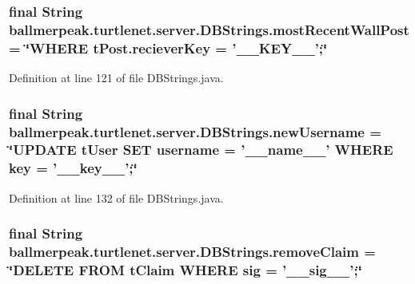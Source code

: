 \hypertarget{classballmerpeak_1_1turtlenet_1_1server_1_1DBStrings_ad9c0536856622b589ca1c0877681c86c}{
\subsubsection[{most\-Recent\-Wall\-Post}]{\setlength{\rightskip}{0pt plus 5cm}final String ballmerpeak.\-turtlenet.\-server.\-D\-B\-Strings.\-most\-Recent\-Wall\-Post = \char`\"{}W\-H\-E\-R\-E t\-Post.\-reciever\-Key = '\-\_\-\-\_\-\-K\-E\-Y\-\_\-\-\_\-';\char`\"{}\hspace{0.3cm}{\ttfamily [static]}}}\label{classballmerpeak_1_1turtlenet_1_1server_1_1DBStrings_ad9c0536856622b589ca1c0877681c86c}


Definition at line 121 of file D\-B\-Strings.\-java.

\hypertarget{classballmerpeak_1_1turtlenet_1_1server_1_1DBStrings_a9561d2bc731daafe8e20cb46dc51cfb6}{
\subsubsection[{new\-Username}]{\setlength{\rightskip}{0pt plus 5cm}final String ballmerpeak.\-turtlenet.\-server.\-D\-B\-Strings.\-new\-Username = \char`\"{}U\-P\-D\-A\-T\-E t\-User S\-E\-T username = '\-\_\-\-\_\-name\-\_\-\-\_\-' W\-H\-E\-R\-E key = '\-\_\-\-\_\-key\-\_\-\-\_\-';\char`\"{}\hspace{0.3cm}{\ttfamily [static]}}}\label{classballmerpeak_1_1turtlenet_1_1server_1_1DBStrings_a9561d2bc731daafe8e20cb46dc51cfb6}


Definition at line 132 of file D\-B\-Strings.\-java.

\hypertarget{classballmerpeak_1_1turtlenet_1_1server_1_1DBStrings_a01691bb9e0418b279a1eb0bcddb94b14}{
\subsubsection[{remove\-Claim}]{\setlength{\rightskip}{0pt plus 5cm}final String ballmerpeak.\-turtlenet.\-server.\-D\-B\-Strings.\-remove\-Claim = \char`\"{}D\-E\-L\-E\-T\-E F\-R\-O\-M t\-Claim W\-H\-E\-R\-E sig = '\-\_\-\-\_\-sig\-\_\-\-\_\-';\char`\"{}\hspace{0.3cm}{\ttfamily [static]}}}\label{classballmerpeak_1_1turtlenet_1_1server_1_1DBStrings_a01691bb9e0418b279a1eb0bcddb94b14}


